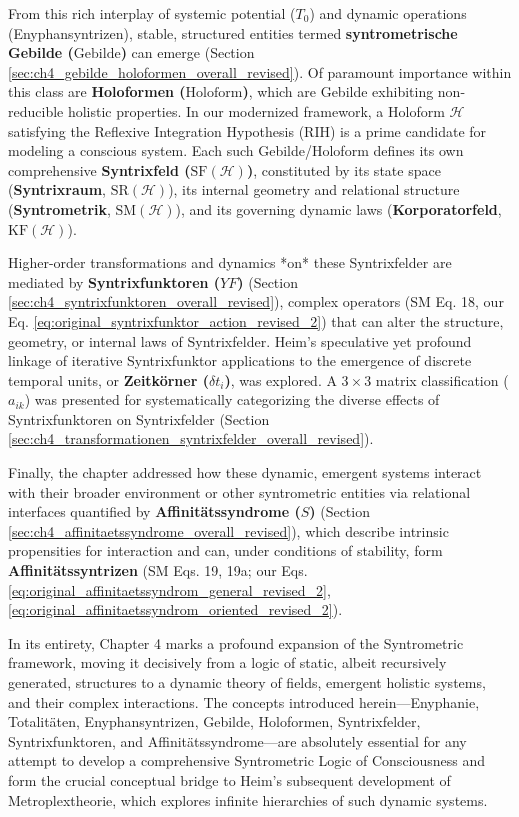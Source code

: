 \documentclass[
    12pt,              %
    a4paper,           %
    headings=normal,   %
    twoside=true,      %
    BCOR=8mm,          %
]{scrbook}
\newcommand{\syntrometrischesGebilde}{\text{Gebilde}}
\newcommand{\holoform}{\text{Holoform}}
\newcommand{\syntrixfunktor}{YF}
\newcommand{\zeitkorn}{\delta t_i}
\newcommand{\affinitaetssyndrom}{S}
\begin{document}
From this rich interplay of systemic potential (\(T_0\)) and dynamic operations (Enyphansyntrizen), stable, structured entities termed \textbf{syntrometrische Gebilde (\(\syntrometrischesGebilde\))} can emerge (Section \ref{sec:ch4_gebilde_holoformen_overall_revised}). Of paramount importance within this class are \textbf{Holoformen (\(\holoform\))}, which are Gebilde exhibiting non-reducible holistic properties. In our modernized framework, a Holoform \(\mathcal{H}\) satisfying the Reflexive Integration Hypothesis (RIH) is a prime candidate for modeling a conscious system. Each such Gebilde/Holoform defines its own comprehensive \textbf{Syntrixfeld (\(\text{SF}(\mathcal{H})\))}, constituted by its state space (\textbf{Syntrixraum}, \(\text{SR}(\mathcal{H})\)), its internal geometry and relational structure (\textbf{Syntrometrik}, \(\text{SM}(\mathcal{H})\)), and its governing dynamic laws (\textbf{Korporatorfeld}, \(\text{KF}(\mathcal{H})\)).

Higher-order transformations and dynamics *on* these Syntrixfelder are mediated by \textbf{Syntrixfunktoren (\(\syntrixfunktor\))} (Section \ref{sec:ch4_syntrixfunktoren_overall_revised}), complex operators (SM Eq. 18, our Eq. \eqref{eq:original_syntrixfunktor_action_revised_2}) that can alter the structure, geometry, or internal laws of Syntrixfelder. Heim’s speculative yet profound linkage of iterative Syntrixfunktor applications to the emergence of discrete temporal units, or \textbf{Zeitkörner (\(\zeitkorn\))}, was explored. A \(3 \times 3\) matrix classification (\(a_{ik}\)) was presented for systematically categorizing the diverse effects of Syntrixfunktoren on Syntrixfelder (Section \ref{sec:ch4_transformationen_syntrixfelder_overall_revised}).

Finally, the chapter addressed how these dynamic, emergent systems interact with their broader environment or other syntrometric entities via relational interfaces quantified by \textbf{Affinitätssyndrome (\(\affinitaetssyndrom\))} (Section \ref{sec:ch4_affinitaetssyndrome_overall_revised}), which describe intrinsic propensities for interaction and can, under conditions of stability, form \textbf{Affinitätssyntrizen} (SM Eqs. 19, 19a; our Eqs. \eqref{eq:original_affinitaetssyndrom_general_revised_2}, \eqref{eq:original_affinitaetssyndrom_oriented_revised_2}).

In its entirety, Chapter 4 marks a profound expansion of the Syntrometric framework, moving it decisively from a logic of static, albeit recursively generated, structures to a dynamic theory of fields, emergent holistic systems, and their complex interactions. The concepts introduced herein—Enyphanie, Totalitäten, Enyphansyntrizen, Gebilde, Holoformen, Syntrixfelder, Syntrixfunktoren, and Affinitätssyndrome—are absolutely essential for any attempt to develop a comprehensive Syntrometric Logic of Consciousness and form the crucial conceptual bridge to Heim's subsequent development of Metroplextheorie, which explores infinite hierarchies of such dynamic systems.
\end{document}
